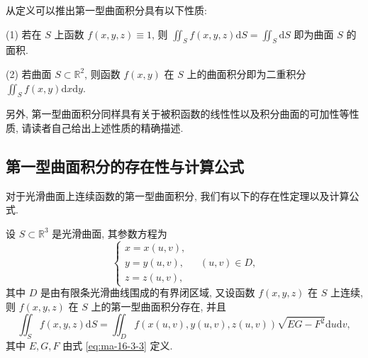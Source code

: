 从定义可以推出第一型曲面积分具有以下性质:

(1) 若在 $S$ 上函数 $f(x,y,z)\equiv1$, 则 $\iint_S f(x,y,z)\mathrm dS=\iint_S\mathrm dS$ 即为曲面 $S$ 的面积.

(2) 若曲面 $S\subset\mathbb R^2$, 则函数 $f(x,y)$ 在 $S$ 上的曲面积分即为二重积分 $\iint_S f(x,y)\mathrm dx\mathrm dy$.

另外, 第一型曲面积分同样具有关于被积函数的线性性以及积分曲面的可加性等性质, 请读者自己给出上述性质的精确描述.

\subsection{第一型曲面积分的存在性与计算公式}
\label{subsec:ma-16-3-3}

对于光滑曲面上连续函数的第一型曲面积分, 我们有以下的存在性定理以及计算公式.

\begin{theorem}\label{theorem:ma-16-3-2}
设 $S\subset\mathbb R^3$ 是光滑曲面, 其参数方程为
\[
  \begin{cases}
    x=x(u,v),\\
    y=y(u,v),\\
    z=z(u,v),
  \end{cases}
  \quad (u,v)\in D,
\]
其中 $D$ 是由有限条光滑曲线围成的有界闭区域, 又设函数 $f(x,y,z)$ 在 $S$ 上连续, 则 $f(x,y,z)$ 在 $S$ 上的第一型曲面积分存在, 并且
\begin{equation}
  \iint_S f(x,y,z)\mathrm dS
  =\iint_D f(x(u,v),y(u,v),z(u,v))\sqrt{EG-F^2}\mathrm du\mathrm dv,
  \label{eq:ma-16-3-4}
\end{equation}
其中 $E,G,F$ 由式 \eqref{eq:ma-16-3-3} 定义.
\end{theorem}


